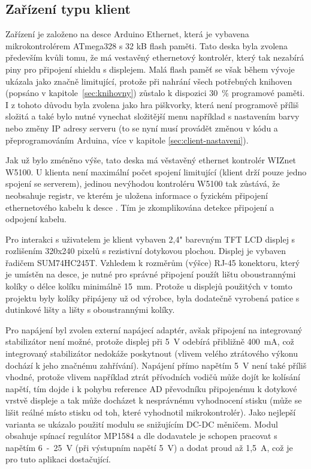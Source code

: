 \subsection{Zařízení typu klient}
\label{sec:HWclient}
Zařízení je založeno na desce Arduino Ethernet, která je vybavena mikrokontrolérem ATmega328 s 32 kB flash paměti. Tato deska byla zvolena především kvůli tomu, že má vestavěný ethernetový kontrolér, který tak nezabírá piny pro připojení shieldu s displejem. Malá flash paměť se však během vývoje ukázala jako značně limitující, protože při nahrání všech potřebných knihoven (popsáno v kapitole~\ref{sec:knihovny}) zůstalo k dispozici 30~\% programové paměti. I z tohoto důvodu byla zvolena jako hra piškvorky, která není programově příliš složitá a také bylo nutné vynechat složitější menu například s nastavením barvy nebo změny IP adresy serveru (to se nyní musí provádět změnou v kódu a přeprogramováním Arduina, více v kapitole \ref{sec:client-nastaveni}).

Jak už bylo zméněno výše, tato deska má věstavěný ethernet kontrolér WIZnet W5100. U klienta není maximální počet spojení limitující (klient drží pouze jedno spojení se serverem), jedinou nevýhodou kontroléru W5100 tak zůstává, že neobsahuje registr, ve kterém je uložena informace o fyzickém připojení ethernetového kabelu k desce \cite{datasheet_w5100}. Tím je zkomplikována detekce připojení a odpojení kabelu.

Pro interakci s uživatelem je klient vybaven 2,4" barevným TFT LCD displej s rozlišením 320x240 pixelů s rezistivní dotykovou plochou. Displej je vybaven  řadičem SUM74HC245T. Vzhledem k rozměrům (výšce) RJ-45 konektoru, který je umístěn na desce, je nutné pro správné připojení použít lištu oboustrannými kolíky o délce kolíku minimálně 15~mm. Protože u displejů použitých v tomto projektu byly kolíky připájeny už od výrobce, byla dodatečně vyrobená patice s dutinkové lišty a lišty s oboustrannými kolíky.

Pro napájení byl zvolen externí napájecí adaptér, avšak připojení na integrovaný stabilizátor není možné, protože displej při 5~V odebírá přibližně 400~mA, což integrovaný stabilizátor nedokáže poskytnout (vlivem velého ztrátového výkonu dochází k jeho značnému zahřívání). Napájení přímo napětím 5~V není také příliš vhodné, protože vlivem například ztrát přívodních vodičů může dojít ke kolísání napětí, tím dojde i k pohybu reference AD převodníku připojenému k dotykové vrstvě displeje a tak může docházet k nesprávnému vyhodnocení stisku (může se lišit reálné místo stisku od toh, které vyhodnotil mikrokontrolér). Jako nejlepší varianta se ukázalo použití modulu se snižujícím DC-DC měničem. Modul obsahuje spínací regulátor MP1584 a dle dodavatele je schopen pracovat s napětím 6~-~25~V (při výstupním napětí 5~V) a dodat proud až 1,5~A, což je pro tuto aplikaci dostačující.

